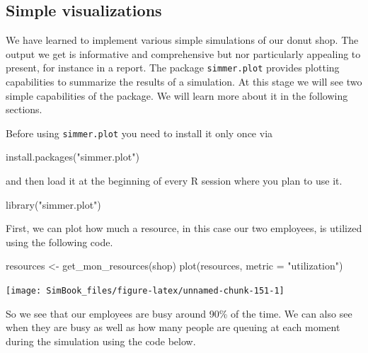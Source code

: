 \documentclass[
]{book}
\newenvironment{Shaded}{\begin{snugshade}}{\end{snugshade}}
\newcommand{\AttributeTok}[1]{\textcolor[rgb]{0.77,0.63,0.00}{#1}}
\newcommand{\FunctionTok}[1]{\textcolor[rgb]{0.00,0.00,0.00}{#1}}
\newcommand{\NormalTok}[1]{#1}
\newcommand{\OtherTok}[1]{\textcolor[rgb]{0.56,0.35,0.01}{#1}}
\newcommand{\StringTok}[1]{\textcolor[rgb]{0.31,0.60,0.02}{#1}}
\begin{document}
\hypertarget{simple-visualizations}{%
\subsection{Simple visualizations}\label{simple-visualizations}}

We have learned to implement various simple simulations of our donut shop. The output we get is informative and comprehensive but nor particularly appealing to present, for instance in a report. The package \texttt{simmer.plot} provides plotting capabilities to summarize the results of a simulation. At this stage we will see two simple capabilities of the package. We will learn more about it in the following sections.

Before using \texttt{simmer.plot} you need to install it only once via

\begin{Shaded}
\begin{Highlighting}[]
\FunctionTok{install.packages}\NormalTok{(}\StringTok{"simmer.plot"}\NormalTok{)}
\end{Highlighting}
\end{Shaded}

and then load it at the beginning of every R session where you plan to use it.

\begin{Shaded}
\begin{Highlighting}[]
\FunctionTok{library}\NormalTok{(}\StringTok{"simmer.plot"}\NormalTok{)}
\end{Highlighting}
\end{Shaded}

First, we can plot how much a resource, in this case our two employees, is utilized using the following code.

\begin{Shaded}
\begin{Highlighting}[]
\NormalTok{resources }\OtherTok{\textless{}{-}} \FunctionTok{get\_mon\_resources}\NormalTok{(shop)}
\FunctionTok{plot}\NormalTok{(resources, }\AttributeTok{metric =} \StringTok{"utilization"}\NormalTok{)}
\end{Highlighting}
\end{Shaded}

\begin{center}\texttt{[image: SimBook\_files/figure-latex/unnamed-chunk-151-1]} \end{center}

So we see that our employees are busy around 90\% of the time. We can also see when they are busy as well as how many people are queuing at each moment during the simulation using the code below.
\end{document}
